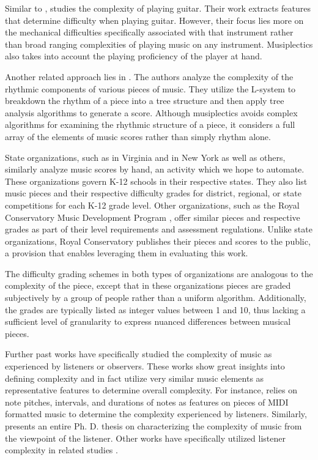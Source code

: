 \documentclass[12pt]{report}
\begin{document}
Similar to \cite{Chiu2012}, \cite{Heijink2002} studies the complexity of playing guitar. Their work extracts features that determine difficulty when playing guitar. However, their focus lies more on the mechanical difficulties specifically associated with that instrument rather than broad ranging complexities of playing music on any instrument. Musiplectics also takes into account the playing proficiency of the player at hand.

Another related approach lies in \cite{Liou2010}. The authors analyze the complexity of the rhythmic components of various pieces of music. They utilize the L-system to breakdown the rhythm of a piece into a tree structure and then apply tree analysis algorithms to generate a score. Although musiplectics avoids complex algorithms for examining the rhythmic structure of a piece, it considers a full array of the elements of music scores rather than simply rhythm alone.

State organizations, such as \cite{VBODA} in Virginia and \cite{NYSSMA} in New York as well as others, similarly analyze music scores by hand, an activity which we hope to automate. These organizations govern K-12 schools in their respective states. They also list music pieces and their respective difficulty grades for district, regional, or state competitions for each K-12 grade level. Other organizations, such as the Royal Conservatory Music Development Program \cite{RoyalSyllabus}, offer similar pieces and respective grades as part of their level requirements and assessment regulations. Unlike state organizations, Royal Conservatory publishes their pieces and scores to the public, a provision that enables leveraging them in evaluating this work.

The difficulty grading schemes in both types of organizations are analogous to the complexity of the piece, except that in these organizations pieces are graded subjectively by a group of people rather than a uniform algorithm. Additionally, the grades are typically listed as integer values between 1 and 10, thus lacking a sufficient level of granularity to express nuanced differences between musical pieces.

Further past works have specifically studied the complexity of music as experienced by listeners or observers. These works show great insights into defining complexity and in fact utilize very similar music elements as representative features to determine overall complexity. For instance, \cite{madsen2006music} relies on note pitches, intervals, and durations of notes as features on pieces of MIDI formatted music to determine the complexity experienced by listeners. Similarly, \cite{streich2006automatic} presents an entire Ph. D. thesis on characterizing the complexity of music from the viewpoint of the listener. Other works have specifically utilized listener complexity in related studies \cite{Heyduk1975} \cite{parry2004musical} \cite{mauch2011structural} \cite{orr2001relationship} \cite{williams2005effect} \cite{burke1990musical} \cite{north1999can} \cite{steck1975preference}.
\end{document}
